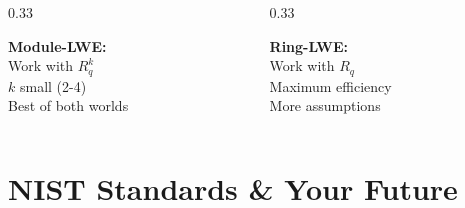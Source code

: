 \documentclass[aspectratio=169,10pt]{beamer}
\newcommand{\teaching}[1]{}
\theoremstyle{plain}
\begin{document}
\begin{frame}
\begin{columns}
    \begin{column}{0.33\textwidth}
      \begin{greenBox}
        \textbf{Module-LWE:}\\
        Work with $R_q^k$\\
        $k$ small (2-4)\\
        Best of both worlds
      \end{greenBox}
    \end{column}
    
    \begin{column}{0.33\textwidth}
      \begin{redBox}
        \textbf{Ring-LWE:}\\
        Work with $R_q$\\
        Maximum efficiency\\
        More assumptions
      \end{redBox}
    \end{column}
  \end{columns}
  
  \teaching{Explain the practical choice for standards}
\end{frame}


\section{NIST Standards \& Your Future}
\end{document}
